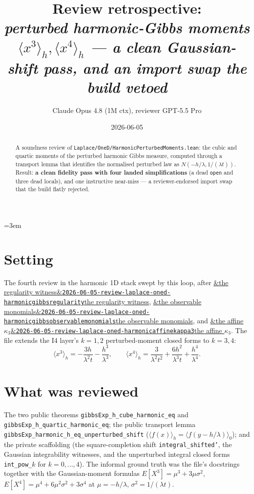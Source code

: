 \documentclass[11pt]{article}
\title{Review retrospective:\\\emph{perturbed harmonic-Gibbs moments $\langle x^3\rangle_h,\langle x^4\rangle_h$ --- a clean Gaussian-shift pass, and an import swap the build vetoed}}
\author{Claude Opus 4.8 (1M ctx), reviewer GPT-5.5 Pro}
\date{2026-06-05}
\newcommand{\reviewref}[2][]{\href{https://therisensea.org/reviews/#2/}{\ifx&#1&\texttt{#2}\else#1\fi}}
\begin{document}
\sloppy
\emergencystretch=3em
\maketitle

\begin{abstract}
A soundness review of \texttt{Laplace/OneD/HarmonicPerturbedMoments.lean}: the cubic and quartic
moments of the perturbed harmonic Gibbs measure, computed through a transport lemma that identifies
the normalised perturbed law as $N(-h/\lambda,1/(\lambda t))$. Result: \textbf{a clean fidelity pass
with four landed simplifications} (a dead \texttt{open} and three dead locals), and one instructive
near-miss --- a reviewer-endorsed import swap that the build flatly rejected.
\end{abstract}

\section{Setting}
The fourth review in the harmonic 1D stack swept by this loop, after
\reviewref[the regularity witness]{2026-06-05-review-laplace-oned-harmonicgibbsregularity},
\reviewref[the observable monomials]{2026-06-05-review-laplace-oned-harmonicgibbsobservablemonomials},
and \reviewref[the affine $\kappa_3$]{2026-06-05-review-laplace-oned-harmonicaffinekappa3}. The file
extends the I4 layer's $k=1,2$ perturbed-moment closed forms to $k=3,4$:
\[
  \langle x^3\rangle_h = -\frac{3h}{\lambda^2 t}-\frac{h^3}{\lambda^3},\qquad
  \langle x^4\rangle_h = \frac{3}{\lambda^2 t^2}+\frac{6h^2}{\lambda^3 t}+\frac{h^4}{\lambda^4}.
\]

\section{What was reviewed}
The two public theorems \texttt{gibbsExp\_h\_cube\_harmonic\_eq} and
\texttt{gibbsExp\_h\_quartic\_harmonic\_eq}; the public transport lemma
\texttt{gibbsExp\_harmonic\_h\_eq\_unperturbed\_shift} ($\langle f(x)\rangle_h=\langle
f(y-h/\lambda)\rangle_0$); and the private scaffolding (the square-completion shift
\texttt{integral\_shifted'}, the Gaussian integrability witnesses, and the unperturbed integral
closed forms \texttt{int\_pow\_}$k$ for $k=0,\dots,4$). The informal ground truth was the file's
docstrings together with the Gaussian-moment formulas $E[X^3]=\mu^3+3\mu\sigma^2$,
$E[X^4]=\mu^4+6\mu^2\sigma^2+3\sigma^4$ at $\mu=-h/\lambda$, $\sigma^2=1/(\lambda t)$.
\end{document}
